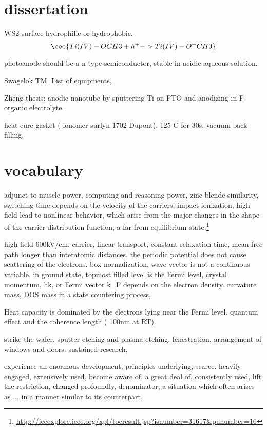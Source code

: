 \section{dissertation}

WS2 surface hydrophilic or hydrophobic.
\[
\cee{Ti(IV)-OCH3 + h^+ -> Ti(IV)-O^+CH3}
\]

 photoanode should be a n-type semiconductor, stable in acidic aqueous solution.

Swagelok TM. List of equipments,

Zheng thesis:  anodic nanotube by sputtering Ti on FTO and anodizing in F-organic electrolyte.

heat cure gasket ( ionomer surlyn 1702 Dupont), 125 C for 30s.
vacuum back filling.



\section{vocabulary}


adjunct to muscle power, computing and reasoning power, zinc-blende similarity, switching time depends on the velocity of the carriers; impact ionization, high field lead to nonlinear behavior, which arise from the major changes in the shape of the carrier distribution function, a far from equilibrium state.\footnote{\url{http://ieeexplore.ieee.org/xpl/tocresult.jsp?isnumber=31617&punumber=16}}

high field 600kV/cm. carrier, linear transport, constant relaxation time, mean free path longer than interatomic distances. the periodic potential does not cause scattering of the electrons. box normalization, wave vector is not a continuous variable. in ground state, topmost filled level is the Fermi level, crystal momentum, hk, or Fermi vector k_F depends on the electron density. curvature mass, DOS mass in a state countering process,

Heat capacity is dominated by the electrons lying near the Fermi level. quantum effect and the coherence length ( 100nm at RT).

strike the wafer, sputter etching and plasma etching. fenestration, arrangement of windows and doors. sustained research,

experience an enormous development, principles underlying, scarce. heavily engaged, extensively used, become aware of, a great deal of, consistently used, lift the restriction, changed profoundly, denominator, a situation which often arises as ... in a manner similar to its counterpart.

